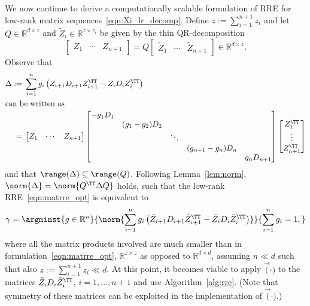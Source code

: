 We now continue to derive a computationally scalable formulation of \ac{RRE} for low-rank matrix sequences~\eqref{eqn:Xi_lr_decomp}.
Define $z := \sum_{i=1}^{n+1} z_i$ and let
$Q  \in\mathbb{R}^{d\times z}$ and
$\tilde Z_i\in\mathbb{R}^{z\times z_i}$ be given by the thin QR-decomposition
\begin{equation}
	\begin{bmatrix}
		Z_1 & \cdots & Z_{n+1}
	\end{bmatrix}
	= Q \begin{bmatrix}
		\tilde Z_1 & \cdots & \tilde Z_{n+1}
	\end{bmatrix}
	\in\mathbb{R}^{d\times z}
	.
\end{equation}
Observe that
\begin{align}
	\Delta
	:={}& \sum_{i=1}^{n} g_i \left(
		Z_{i+1} D_{i+1} Z_{i+1}^\TT - Z_i D_i Z_i^\TT
	\right) \\
\intertext{can be written as}
	={}& \begin{bmatrix}
		Z_1 & \cdots & Z_{n+1}
	\end{bmatrix}
	\begin{bmatrix}
		-g_1 D_1 \\
		& (g_1 - g_2) D_2 \\
		&& \ddots \\
		&&& (g_{n-1} - g_n) D_n \\
		&&&& g_n D_{n+1}
	\end{bmatrix}
	\begin{bmatrix}
		Z_1^\TT \\
		\vdots \\
		Z_{n+1}^\TT
	\end{bmatrix}
\end{align}
and that $\range(\Delta) \subseteq \range(Q)$.
Following Lemma~\ref{lem:norm},
$\norm{\Delta} = \norm{Q^\TT \Delta Q}$ holds,
such that the low-rank \ac{RRE}~\eqref{eqn:matrre_opt} is equivalent to
\begin{equation}
	\gamma = \argminst{%
		g\in\mathbb R^n
	}{%
		\norm{ \sum_{i=1}^{n} g_i \left( \tilde Z_{i+1} D_{i+1} \tilde Z_{i+1}^\TT - \tilde Z_i D_i \tilde Z_i^\TT \right) }
	}{%
		\sum_{i=1}^{n} g_i = 1
		,
	}
	\label{eqn:matrre_opt_efficient}
\end{equation}
where all the matrix products involved are much smaller than in formulation~\eqref{eqn:matrre_opt},
$\mathbb{R}^{z\times z}$ as opposed to $\mathbb{R}^{d\times d}$,
assuming $n \ll d$ such that also $z := \sum_{i=1}^{n+1} z_i \ll d$.
At this point,
it becomes viable to apply $\vec(\cdot)$ to the matrices $\tilde Z_i D_i \tilde Z_i^\TT$, $i = 1, \ldots, n+1$
and use Algorithm~\ref{alg:rre}.
(Note that symmetry of these matrices can be exploited in the implementation of $\vec(\cdot)$.)

